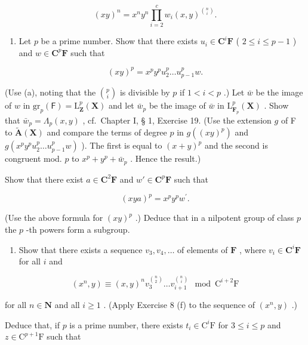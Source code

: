 \[
(x y) ^ {n} = x ^ {n} y ^ {n} \prod_ {i = 2} ^ {c} w _ {i} (x, y) ^ {\binom {n} {i}}.
\]

\begin{enumerate}
\def\labelenumi{(\alph{enumi})}
\setcounter{enumi}{2}
\tightlist
\item
  Let \(p\) be a prime number. Show that there exists \(u_{i} \in \mathbf{C}^{i}\mathbf{F}\) ( \(2 \leqslant i \leqslant p - 1\) ) and \(w \in \mathbf{C}^{p}\mathbf{F}\) such that
\end{enumerate}

\[
(x y) ^ {p} = x ^ {p} y ^ {p} u _ {2} ^ {p} \dots u _ {p - 1} ^ {p} w.
\]

(Use (a), noting that the \(\binom{p}{i}\) is divisible by \(p\) if \(1 < i < p\) .) Let \(\bar{w}\) be the image of \(w\) in \(\mathrm{gr}_p(\mathsf{F}) = \mathrm{L}_{\mathbf{Z}}^p (\mathbf{X})\) and let \(\bar{w}_p\) be the image of \(\bar{w}\) in \(\mathrm{L}_{\mathbf{F}_p}^p (\mathbf{X})\) . Show that \(\bar{w}_p = \Lambda_p(x,y)\) , cf.~Chapter I, § 1, Exercise 19. (Use the extension \(g\) of F to \(\tilde{\mathbf{A}}(\mathbf{X})\) and compare the terms of degree \(p\) in \(g((xy)^p)\) and \(g(x^p y^p u_2^p \ldots u_{p-1}^p w)\) ). The first is equal to \((x + y)^p\) and the second is congruent mod. \(p\) to \(x^p + y^p + \bar{w}_p\) . Hence the result.)

Show that there exist \(a \in \mathbf{C}^2\mathbf{F}\) and \(w' \in \mathbf{C}^p\mathbf{F}\) such that

\[
(x y a) ^ {p} = x ^ {p} y ^ {p} w ^ {\prime}.
\]

(Use the above formula for \((xy)^p\) .) Deduce that in a nilpotent group of class \(p\) the \(p\) -th powers form a subgroup.

\begin{enumerate}
\def\labelenumi{(\alph{enumi})}
\setcounter{enumi}{3}
\tightlist
\item
  Show that there exists a sequence \(v_{3}, v_{4}, \ldots\) of elements of \(\mathbf{F}\) , where \(v_{i} \in \mathbf{C}^{i}\mathbf{F}\) for all \(i\) and
\end{enumerate}

\[
(x ^ {n}, y) \equiv (x, y) ^ {n} v _ {3} ^ {\binom {n} {2}} \dots v _ {i + 1} ^ {\binom {n} {i}} \mod \mathrm{C} ^ {i + 2} \mathrm{F}
\]

for all \(n \in \mathbf{N}\) and all \(i \geqslant 1\) . (Apply Exercise 8 (f) to the sequence of \((x^n, y)\) .)

Deduce that, if \(p\) is a prime number, there exists \(t_i \in \mathrm{C}^i\mathrm{F}\) for \(3 \leqslant i \leqslant p\) and \(z \in \mathrm{C}^{p+1}\mathrm{F}\) such that

